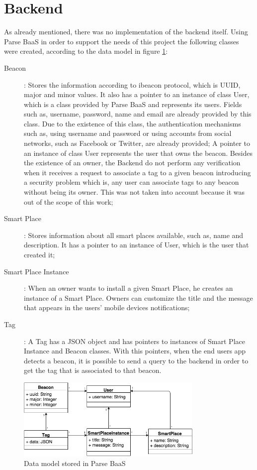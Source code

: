 \section{Backend}
\label{sec:implementation_backend}
As already mentioned, there was no implementation of the backend itself.
Using Parse \gls{BaaS} in order to support the needs of this project the following classes were
created, according to the data model in figure \ref{fig:backend_data_model}:
\begin{description}
  \item[Beacon]: Stores the information according to ibeacon protocol,
  which is \gls{UUID}, major and minor values. It also has a pointer
  to an instance of class User, which is a class provided by Parse \gls{BaaS} and represents its users. Fields such as, username, password, name and email are already provided by this class.
  Due to the existence of this class, the authentication mechanisms such as, using username and password or using accounts from social networks, such as Facebook or Twitter, are already provided;
  A pointer to an instance of class User represents the user that owns the beacon.
  Besides the existence of an owner, the Backend do not perform any verification when it receives a request to associate a tag to a given beacon introducing a security problem which is, any user can associate tags to any beacon without being its owner.
  This was not taken into account because it was out of the scope of this work;
  \item[Smart Place]:
  Stores information about all smart places available,
  such as, name and description. It has a pointer to an instance of
  User, which is the user that created it;
  \item[Smart Place Instance]: When an owner wants to install a given
  Smart Place, he creates an instance of a Smart Place. Owners can
  customize the title and the message that appears in the users'
  mobile devices notifications;
  \item[Tag]:
  A Tag has a \gls{JSON} object and has pointers to instances
  of Smart Place Instance and Beacon classes. With this pointers, when
  the end users app detects a beacon, it is possible to send a query to
  the backend in order to get the tag that is associated to that beacon.
\end{description}

\begin{figure}[!ht]
  \centering
    \includegraphics[width=0.8\textwidth]{images/backend_data_model}
    \caption[Data model]{Data model stored in Parse \gls{BaaS}}
    \label{fig:backend_data_model}
\end{figure}

